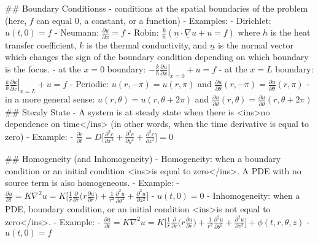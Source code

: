 ## Boundary Conditionss
- conditions at the spatial boundaries of the problem (here, $f$ can equal 0, a constant, or a function)
    - Examples:
        - Dirichlet: $u(t,0) = f$
        - Neumann: $\frac{\partial u}{\partial x} = f$
        - Robin: $\frac{k}{n}(\underline{n} \cdot \underline{\nabla}u + u = f)$ where $h$ is the heat transfer coefficient, $k$ is the thermal conductivity, and $\underline{n}$ is the normal vector which changes the sign of the boundary condition depending on which boundary is the focus.
            - at the $x=0$ boundary: $- \left.\frac{k}{h} \frac{\partial u}{\partial x}\right|_ {x=0} + u = f$
            - at the $x=L$ boundary: $\left.\frac{k}{h} \frac{\partial u}{\partial x}\right|_ {x=L} + u = f$
        - Periodic: $u(r,-\pi) = u(r,\pi)$ and $\frac{\partial u}{\partial \theta}(r,-\pi) = \frac{\partial u}{\partial \theta}(r,\pi)$
            - in a more general sense: $u(r,\theta) = u(r, \theta + 2\pi)$ and $\frac{\partial u}{\partial \theta}(r,\theta) = \frac{\partial u}{\partial \theta}(r,\theta + 2\pi)$
## Steady State
- A system is at steady state when there is <ins>no dependence on time</ins> (in other words, when the time derivative is equal to zero)
    - Example:
        - $\frac{\partial c}{\partial t} = D\biggl[\frac{\partial^2 c}{\partial x^2} + \frac{\partial^2 c}{\partial y^2} + \frac{\partial^2 c}{\partial z^2}\biggl] = 0$

## Homogeneity (and Inhomogeneity)
- Homogeneity: when a boundary condition or an initial condition <ins>is equal to zero</ins>. A PDE with no source term is also homogeneous.
    - Example:
        - $\frac{\partial u}{\partial t} = K\nabla^2 u = K\biggl[\frac{1}{r} \frac{\partial}{\partial r}\big( r \frac{\partial u}{\partial r}\big) + \frac{1}{r^2} \frac{\partial^2 u}{\partial \theta^2} + \frac{\partial^2 u}{\partial z^2}\biggl]$ 
        - $u(t,0) = 0$
- Inhomogeneity: when a PDE, boundary condition, or an initial condition <ins>is not equal to zero</ins>.
    - Example:
        - $\frac{\partial u}{\partial t} = K\nabla^2 u = K\biggl[\frac{1}{r} \frac{\partial}{\partial r}\big( r \frac{\partial u}{\partial r}\big) + \frac{1}{r^2} \frac{\partial^2 u}{\partial \theta^2} + \frac{\partial^2 u}{\partial z^2}\biggl] + \phi (t,r,\theta,z)$
        - $u(t,0) = f$
